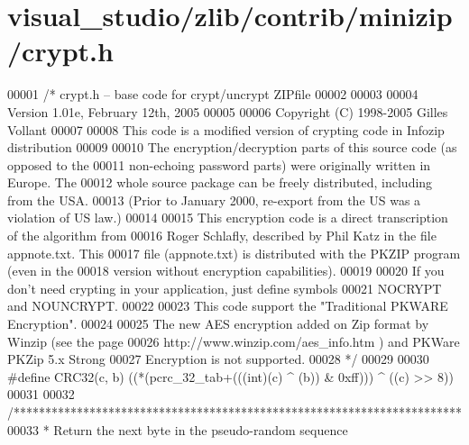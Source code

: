 \hypertarget{visual__studio_2zlib_2contrib_2minizip_2crypt_8h_source}{}\section{visual\+\_\+studio/zlib/contrib/minizip/crypt.h}
\label{visual__studio_2zlib_2contrib_2minizip_2crypt_8h_source}

\begin{DoxyCode}
00001 \textcolor{comment}{/* crypt.h -- base code for crypt/uncrypt ZIPfile}
00002 \textcolor{comment}{}
00003 \textcolor{comment}{}
00004 \textcolor{comment}{   Version 1.01e, February 12th, 2005}
00005 \textcolor{comment}{}
00006 \textcolor{comment}{   Copyright (C) 1998-2005 Gilles Vollant}
00007 \textcolor{comment}{}
00008 \textcolor{comment}{   This code is a modified version of crypting code in Infozip distribution}
00009 \textcolor{comment}{}
00010 \textcolor{comment}{   The encryption/decryption parts of this source code (as opposed to the}
00011 \textcolor{comment}{   non-echoing password parts) were originally written in Europe.  The}
00012 \textcolor{comment}{   whole source package can be freely distributed, including from the USA.}
00013 \textcolor{comment}{   (Prior to January 2000, re-export from the US was a violation of US law.)}
00014 \textcolor{comment}{}
00015 \textcolor{comment}{   This encryption code is a direct transcription of the algorithm from}
00016 \textcolor{comment}{   Roger Schlafly, described by Phil Katz in the file appnote.txt.  This}
00017 \textcolor{comment}{   file (appnote.txt) is distributed with the PKZIP program (even in the}
00018 \textcolor{comment}{   version without encryption capabilities).}
00019 \textcolor{comment}{}
00020 \textcolor{comment}{   If you don't need crypting in your application, just define symbols}
00021 \textcolor{comment}{   NOCRYPT and NOUNCRYPT.}
00022 \textcolor{comment}{}
00023 \textcolor{comment}{   This code support the "Traditional PKWARE Encryption".}
00024 \textcolor{comment}{}
00025 \textcolor{comment}{   The new AES encryption added on Zip format by Winzip (see the page}
00026 \textcolor{comment}{   http://www.winzip.com/aes\_info.htm ) and PKWare PKZip 5.x Strong}
00027 \textcolor{comment}{   Encryption is not supported.}
00028 \textcolor{comment}{*/}
00029 
00030 \textcolor{preprocessor}{#define CRC32(c, b) ((*(pcrc\_32\_tab+(((int)(c) ^ (b)) & 0xff))) ^ ((c) >> 8))}
00031 
00032 \textcolor{comment}{/***********************************************************************}
00033 \textcolor{comment}{ * Return the next byte in the pseudo-random sequence}

\end{DoxyCode}
